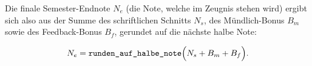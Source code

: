 Die finale Semester-Endnote $N_e$ (die Note, welche im Zeugnis stehen wird) ergibt sich also aus der Summe des schriftlichen Schnitts $N_s$, des Mündlich-Bonus $B_m$ sowie des Feedback-Bonus $B_f$, gerundet auf die nächste halbe Note:

\[N_e=\text{\texttt{runden\_auf\_halbe\_note}}\Big(N_s+B_m+B_f\Big).\]


